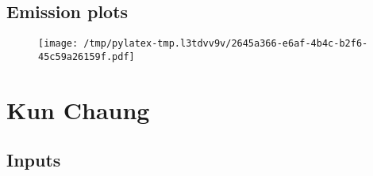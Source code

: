 \documentclass{article}%
\begin{document}
\subsection{Emission plots}%
\label{subsec:Emissionplots}%


\begin{figure}[htbp]%
\centering%
\texttt{[image: /tmp/pylatex-tmp.l3tdvv9v/2645a366-e6af-4b4c-b2f6-45c59a26159f.pdf]}%
\end{figure}

%
\section{Kun Chaung}%
\label{sec:KunChaung}%
\subsection{Inputs}%
\label{subsec:Inputs}%
\end{document}
